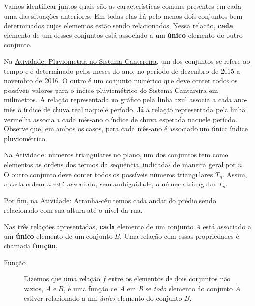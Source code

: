 \label{\detokenize{AF106-1:sec-funcao-organizando-ideias-conceito}}\label{\detokenize{AF106-1::doc}}\label{\detokenize{AF106-1:organizando-as-ideias-conceito-de-funcao}}
Vamos identificar juntos quais são as características comuns presentes em cada uma das situações anteriores. Em todas elas há pelo menos dois conjuntos bem determinados cujos elementos estão sendo relacionados. Nessa relacão, \textbf{cada} elemento de um desses conjuntos está associado a um \textbf{único} elemento do outro conjunto.

Na {\hyperref[\detokenize{AF106-0:ativ-funcoes-pluviometria}]{Atividade: Pluviometria no Sistema Cantareira}}, um dos conjuntos se refere ao tempo e é determinado pelos meses do ano, no período de dezembro de 2015 a novembro de 2016. O outro é um conjunto numérico que deve conter todos os possíveis valores para o índice pluviométrico do Sistema Cantareira em milímetros. A relação representada no gráfico pela linha azul associa a cada ano-mês o índice de chuva real naquele período. Já a relação representada pela linha vermelha associa a cada mês-ano o índice de chuva esperada naquele período. Observe que, em ambos os casos, para cada mês-ano é associado um único índice pluviométrico.

Na {\hyperref[\detokenize{AF106-4:ativ-funcoes-numeros-triangulares}]{Atividade: números triangulares no plano}}, um dos conjuntos tem como elementos as ordens dos termos da sequência, indicadas de maneira geral por \(n\). O outro conjunto deve conter todos os possíveis números triangulares \(T_n\). Assim, a cada ordem \(n\) está associado, sem ambiguidade, o número triangular \(T_n\).

Por fim, na {\hyperref[\detokenize{ativ-arranha}]{Atividade: Arranha-céu}} temos cada andar do prédio sendo relacionado com sua altura até o nível da rua.

Nas três relações apresentadas, \textbf{cada} elemento de um conjunto \(A\) está associado a um \textbf{único} elemento de um conjunto \(B\). Uma relação com essas propriedades é chamada \textbf{função}.
\begin{description}
\item[{Função}] \leavevmode{}\label{\detokenize{AF106-1:term-funcao}}
Dizemos que uma relação \(f\) entre os elementos de dois conjuntos não vazios, \(A\) e \(B\), é uma função de \(A\) em \(B\) se \emph{todo} elemento do conjunto \(A\) estiver relacionado a um \emph{único} elemento do conjunto \(B\).

\end{description}


